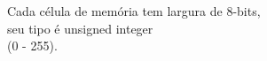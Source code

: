 \documentclass[preview]{standalone}
\begin{document}
Cada célula de memória tem largura de 8-bits,\\seu tipo é unsigned integer\\(0 - 255).\\
\end{document}
